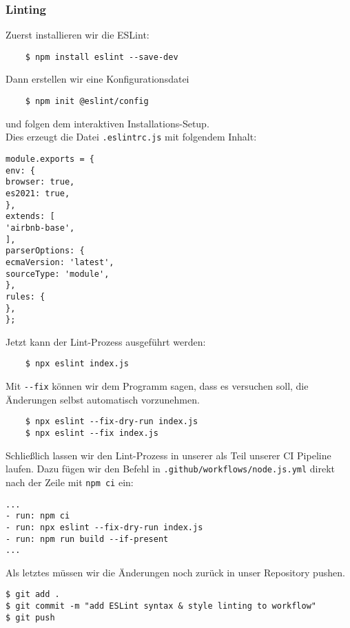 \subsubsection{Linting}
Zuerst installieren wir die ESLint:

\begin{verbatim}
	$ npm install eslint --save-dev
\end{verbatim}

\noindent
Dann erstellen wir eine Konfigurationsdatei

\begin{verbatim}
	$ npm init @eslint/config
\end{verbatim}

\noindent
und folgen dem interaktiven Installations-Setup. \\

\noindent
Dies erzeugt die Datei \verb|.eslintrc.js| mit folgendem Inhalt:

\begin{verbatim}
module.exports = {
env: {
browser: true,
es2021: true,
},
extends: [
'airbnb-base',
],
parserOptions: {
ecmaVersion: 'latest',
sourceType: 'module',
},
rules: {
},
};
\end{verbatim}

\noindent
Jetzt kann der Lint-Prozess ausgeführt werden:

\begin{verbatim}
	$ npx eslint index.js
\end{verbatim}

\noindent
Mit \verb|--fix| können wir dem Programm sagen,
dass es versuchen soll, die Änderungen selbst
automatisch vorzunehmen.

\begin{verbatim}
	$ npx eslint --fix-dry-run index.js
	$ npx eslint --fix index.js
\end{verbatim}

\noindent
Schließlich lassen wir den Lint-Prozess in unserer
als Teil unserer CI Pipeline laufen.
Dazu fügen wir den Befehl in \verb|.github/workflows/node.js.yml|
direkt nach der Zeile mit \verb|npm ci| ein:

\begin{verbatim}
...
- run: npm ci
- run: npx eslint --fix-dry-run index.js
- run: npm run build --if-present
...
\end{verbatim}

\noindent
Als letztes müssen wir die Änderungen noch zurück in unser
Repository pushen.

\begin{verbatim}
$ git add .
$ git commit -m "add ESLint syntax & style linting to workflow"
$ git push
\end{verbatim}


